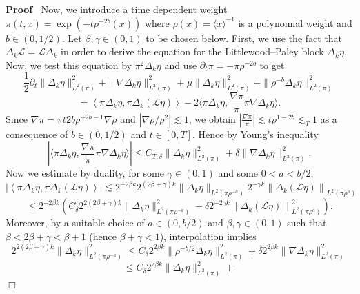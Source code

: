 \documentclass[a4paper,11pt]{article}
\newenvironment{proof}{\noindent\textbf{Proof\ }}{\hspace*{\fill}$\Box$\medskip}
\numberwithin{equation}{section}
\newcommand{\LL}{\mathscr{L}}
\newcommand{\8}{\infty}
\begin{document}
\begin{proof}
  Now, we introduce a time dependent weight $\pi (t, x) = \exp (- t \rho^{- 2
  b} (x))$ where $\rho (x) = \langle x \rangle^{- 1}$ is a polynomial weight
  and $b \in (0, 1 / 2)$. Let $\beta, \gamma \in (0, 1)$ to be chosen below.
  First, we use the fact that $\Delta_k \LL = \LL \Delta_k$ in order to derive
  the equation for the Littlewood--Paley block $\Delta_k \eta$. Now, we test
  this equation by $\pi^2 \Delta_k \eta$ and use $\partial_t \pi = - \pi
  \rho^{- 2 b}$ to get
  \begin{equation}
    \frac{1}{2} \partial_t \| \Delta_k \eta \|_{L^2 (\pi)}^2 + \| \nabla
    \Delta_k \eta \|_{L^2 (\pi)}^2 + \mu \| \Delta_k \eta \|_{L^2 (\pi)}^2 +
    \| \rho^{- b} \Delta_k \eta \|_{L^2 (\pi)}^2 \label{eq:eta}
  \end{equation}
  \[ = \left\langle \pi^{} \Delta_k \eta, \pi \Delta_k \left( \LL \eta \right)
     \right\rangle - 2 \langle \pi \Delta_k \eta, \frac{\nabla \pi}{\pi} \pi
     \nabla \Delta_k \eta \rangle . \]
  Since $\nabla \pi = \pi t 2 b \rho^{- 2 b - 1} \nabla \rho$ and $| \nabla
  \rho / \rho^2 | \lesssim 1$, we obtain $\left| \frac{\nabla \pi}{\pi}
  \right| \lesssim t \rho^{1 - 2 b} \lesssim_T 1$ as a consequence of $b \in
  (0, 1 / 2)$ and $t \in [0, T]$. Hence by Young's inequality
  \[ | \langle \pi \Delta_k \eta, \frac{\nabla \pi}{\pi} \pi \nabla \Delta_k
     \eta \rangle | \leqslant C_{T, \delta} \|  \Delta_k \eta
     \|_{L^2 (\pi)}^2 + \delta \| \nabla \Delta_k \eta \|_{L^2 (\pi)}^2 . \]
  Now we estimate by duality, for some $\gamma \in (0, 1)$ and some $0 < a < b
  / 2$,
  \[ \left| \left\langle \pi^{} \Delta_k \eta, \pi \Delta_k \left( \LL \eta
     \right) \right\rangle \right| \lesssim 2^{- 2 \beta k} 2^{(2 \beta +
     \gamma) k} \| \Delta_k \eta \|_{L^2 (\pi \rho^{- a})} 2^{- \gamma k}
     \left\| \Delta_k \left( \LL \eta \right) \right\|_{L^2 (\pi \rho^a)} \]
  \[ \leqslant 2^{- 2 \beta k} \left( C_{\delta} 2^{2 (2 \beta + \gamma) k} \|
     \Delta_k \eta \|^2_{L^2 (\pi \rho^{- a})} + \delta 2^{- 2 \gamma k}
     \left\| \Delta_k \left( \LL \eta \right) \right\|^2_{L^2 (\pi \rho^a)}
     \right) . \]
  Moreover, by a suitable choice of $a \in (0, b / 2)$ and $\beta, \gamma \in
  (0, 1)$ such that $\beta < 2 \beta + \gamma < \beta + 1$ (hence $\beta +
  \gamma < 1$), interpolation implies
  \[ 2^{2 (2 \beta + \gamma) k} \| \Delta_k \eta \|^2_{L^2 (\pi \rho^{-
     a})} \leqslant C_{\delta} 2^{2 \beta k} \| \rho^{- b / 2} \Delta_k
     \eta \|^2_{L^2 (\pi)} + \delta 2^{2 \beta k} \| \nabla \Delta_k \eta
     \|^2_{L^2 (\pi)} \]
  \[ \leqslant C_{\delta} 2^{2 \beta k} \| \Delta_k \eta \|^2_{L^2 (\pi)} +
\]
\end{proof}
\end{document}
